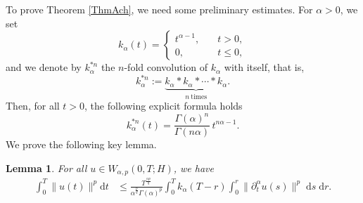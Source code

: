 \documentclass[reqno]{amsart}
\newtheorem{lem}[theorem]{Lemma}
\numberwithin{equation}{section}
\def \d {\mathrm{d}}
\begin{document}
To prove Theorem \ref{ThmAch}, we need some preliminary estimates. For $\alpha>0$, we set
\[
k_\alpha(t)=\begin{cases}
    t^{\alpha-1},\quad & t>0,\\
    0, \quad & t\le 0,
\end{cases}
\]
and we denote by $k_\alpha^{*n}$ the $n$-fold convolution of $k_\alpha$ with itself, that is,
\[
k_\alpha^{*n}
:= \underbrace{k_\alpha * k_\alpha * \cdots * k_\alpha}_{n\ \text{times}}.
\]
Then, for all $t>0$, the following explicit formula holds
\begin{equation}
    k_\alpha^{*n}(t)
= \frac{\Gamma(\alpha)^n}{\Gamma(n\alpha)}\, t^{n\alpha-1}. \label{n_convolution}
\end{equation}
We prove the following key lemma.
\begin{lem}
    For all $u\in W_{\alpha,p}(0,T;H)$, we have
    \begin{align}
		\int_0^T \|u(t)\|^p\d t
		&\le \frac{T^{\frac{\alpha p}{q}}}{\alpha^{\frac{p}{q}}\Gamma(\alpha)^p}\int^T_0 k_{\alpha}(T-r)
		\int_0^r\|\partial_t^\alpha u(s)\|^p\;\d s\;\d r. \label{lm:semi}
	\end{align}
\end{lem}
\end{document}
